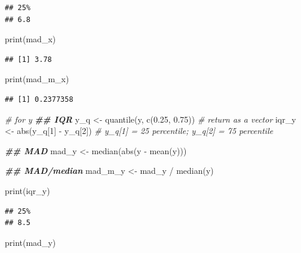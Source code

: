 \documentclass[
]{book}
\newenvironment{Shaded}{\begin{snugshade}}{\end{snugshade}}
\newcommand{\CommentTok}[1]{\textcolor[rgb]{0.56,0.35,0.01}{\textit{#1}}}
\newcommand{\DecValTok}[1]{\textcolor[rgb]{0.00,0.00,0.81}{#1}}
\newcommand{\DocumentationTok}[1]{\textcolor[rgb]{0.56,0.35,0.01}{\textbf{\textit{#1}}}}
\newcommand{\FloatTok}[1]{\textcolor[rgb]{0.00,0.00,0.81}{#1}}
\newcommand{\FunctionTok}[1]{\textcolor[rgb]{0.00,0.00,0.00}{#1}}
\newcommand{\NormalTok}[1]{#1}
\newcommand{\OtherTok}[1]{\textcolor[rgb]{0.56,0.35,0.01}{#1}}
\newcommand{\SpecialCharTok}[1]{\textcolor[rgb]{0.00,0.00,0.00}{#1}}
\begin{document}
\begin{verbatim}
## 25% 
## 6.8
\end{verbatim}

\begin{Shaded}
\begin{Highlighting}[]
\FunctionTok{print}\NormalTok{(mad\_x)}
\end{Highlighting}
\end{Shaded}

\begin{verbatim}
## [1] 3.78
\end{verbatim}

\begin{Shaded}
\begin{Highlighting}[]
\FunctionTok{print}\NormalTok{(mad\_m\_x)}
\end{Highlighting}
\end{Shaded}

\begin{verbatim}
## [1] 0.2377358
\end{verbatim}

\begin{Shaded}
\begin{Highlighting}[]
\CommentTok{\# for y}
\DocumentationTok{\#\# IQR}
\NormalTok{y\_q }\OtherTok{\textless{}{-}} \FunctionTok{quantile}\NormalTok{(y, }\FunctionTok{c}\NormalTok{(}\FloatTok{0.25}\NormalTok{, }\FloatTok{0.75}\NormalTok{)) }\CommentTok{\# return as a vector}
\NormalTok{iqr\_y }\OtherTok{\textless{}{-}} \FunctionTok{abs}\NormalTok{(y\_q[}\DecValTok{1}\NormalTok{] }\SpecialCharTok{{-}}\NormalTok{ y\_q[}\DecValTok{2}\NormalTok{]) }\CommentTok{\# y\_q[1] = 25 percentile; y\_q[2] = 75 percentile}

\DocumentationTok{\#\# MAD}
\NormalTok{mad\_y }\OtherTok{\textless{}{-}} \FunctionTok{median}\NormalTok{(}\FunctionTok{abs}\NormalTok{(y }\SpecialCharTok{{-}} \FunctionTok{mean}\NormalTok{(y)))}

\DocumentationTok{\#\# MAD/median}
\NormalTok{mad\_m\_y }\OtherTok{\textless{}{-}}\NormalTok{ mad\_y }\SpecialCharTok{/} \FunctionTok{median}\NormalTok{(y)}

\FunctionTok{print}\NormalTok{(iqr\_y)}
\end{Highlighting}
\end{Shaded}

\begin{verbatim}
## 25% 
## 8.5
\end{verbatim}

\begin{Shaded}
\begin{Highlighting}[]
\FunctionTok{print}\NormalTok{(mad\_y)}
\end{Highlighting}
\end{Shaded}
\end{document}
